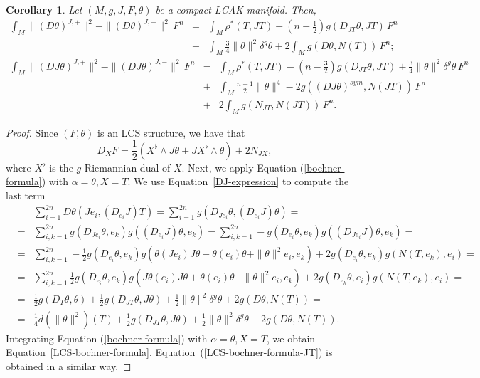 \documentclass[a4paper,11pt]{amsart}
\newtheorem{cor}[thm]{Corollary}
\theoremstyle{definition}
\renewcommand{\[}{\begin{equation*}}
\renewcommand{\]}{\end{equation*}}
\begin{document}
\begin{cor}
Let $(M, g, J, F, \theta)$ be a compact LCAK manifold. Then,
\begin{eqnarray}\label{LCS-bochner-formula}
 \int_M\|(D\theta)^{J,+}\|^2-\|(D\theta)^{J,-}\|^2\,F^n&=&\int_M\rho^\ast(T,JT)-\left(n-\frac{1}{2}\right)g(D_{JT}\theta,JT)\,F^n\nonumber\\
 &-&\int_M\frac{3}{4}\|\theta\|^2\delta^g\theta+2\int_Mg(D\theta,N(T))\,F^n;
 \end{eqnarray}
 \begin{eqnarray}\label{LCS-bochner-formula-JT}
 \int_M \|(DJ\theta)^{J,+}\|^2-\|(DJ\theta)^{J,-}\|^2\,F^n&=&\int_M\rho^\ast(T,JT)-\left(n-\frac{3}{2}\right)g(D_{JT}\theta,JT)+\frac{3}{4}\|\theta\|^2\delta^g\theta\,F^n\nonumber\\
 &+&\int_M\frac{n-1}{2}\|\theta\|^4-2g(\left(DJ\theta\right)^{sym},N(JT))\,F^n\nonumber\\
 &+&2\int_Mg(N_{JT},N(JT))\,F^n.
 \end{eqnarray}
\end{cor}
\begin{proof}
Since $(F,\theta)$ is an LCS structure, we have that
\begin{equation}\label{DJ-expression}
D_XF=\frac{1}{2}\left(X^\flat\wedge J\theta+ JX^\flat\wedge \theta\right)+2N_{JX},
\end{equation}
 where $X^\flat$ is the $g$-Riemannian dual of $X.$ Next, we apply Equation (\ref{bochner-formula}) with  $\alpha=\theta,X=T$.
 We use Equation~\ref{DJ-expression} to compute the last term
\begin{eqnarray*}
& &\sum_{i=1}^{2n} D\theta(Je_i,\left(D_{e_i}J\right)T) =\sum_{i=1}^{2n}g(D_{Je_i}\theta,\left(D_{e_i}J\right)\theta) = \\
&=&\sum_{i,k=1}^{2n}g\left(D_{Je_i}\theta,e_k\right)g\left(\left(D_{e_i}J\right)\theta,e_k\right)= \sum_{i,k=1}^{2n}-g\left(D_{e_i}\theta,e_k\right)g\left(\left(D_{Je_i}J\right)\theta,e_k\right) =\\
&=&\sum_{i,k=1}^{2n}-\frac{1}{2}g\left(D_{e_i}\theta,e_k\right)g\left(\theta(Je_i)J\theta-\theta(e_i)\theta+\|\theta\|^2e_i,e_k\right)+2g\left(D_{e_i}\theta,e_k\right)g(N(T,e_k),e_i) =\\
&=&\sum_{i,k=1}^{2n}\frac{1}{2}g\left(D_{e_i}\theta,e_k\right)g\left(J\theta(e_i)J\theta+\theta(e_i)\theta-\|\theta\|^2e_i,e_k\right)+2g\left(D_{e_k}\theta,e_i\right)g(N(T,e_k),e_i) =\\
&=&\frac{1}{2}g(D_T\theta,\theta)+\frac{1}{2}g(D_{JT}\theta,J\theta)+\frac{1}{2}\|\theta\|^2\delta^g\theta+2g(D\theta,N(T))=\\
&=&\frac{1}{4}d\left(\|\theta\|^2\right)(T)+\frac{1}{2}g(D_{JT}\theta,J\theta)+\frac{1}{2}\|\theta\|^2\delta^g\theta+2g(D\theta,N(T)).
\end{eqnarray*}
Integrating Equation (\ref{bochner-formula}) with $\alpha=\theta,X=T$, we obtain Equation~\ref{LCS-bochner-formula}.
Equation~(\ref{LCS-bochner-formula-JT}) is obtained in a similar way.

\end{proof}
\end{document}
